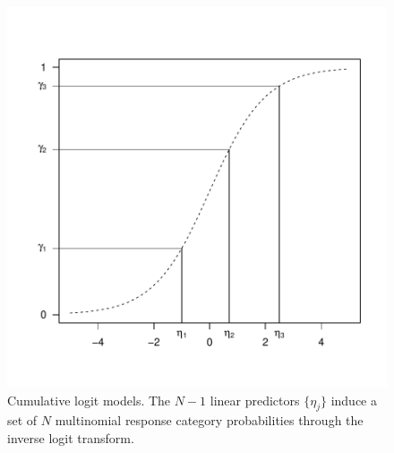 \begin{figure}[ht!]
  \centering
  \includegraphics[width=.8\textwidth]{Figures/cumulative-logit-models}
  \caption{Cumulative logit models.  The $N-1$ linear predictors $\{\eta_j\}$ induce a set of $N$ multinomial response category probabilities through the inverse logit transform. }
  \label{fig:cumulative-logit-models}
\end{figure}